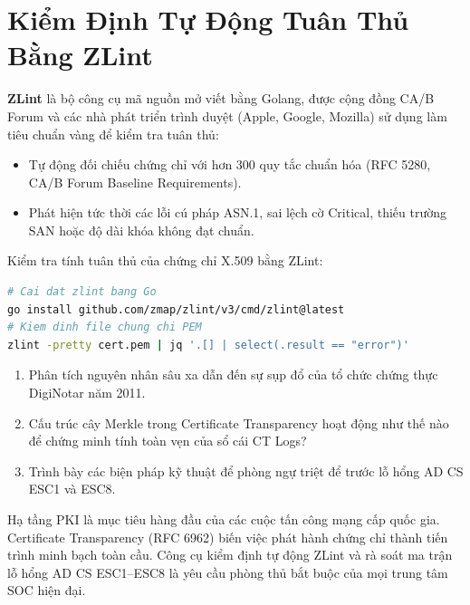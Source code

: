 \section{Kiểm Định Tự Động Tuân Thủ Bằng ZLint}

\textbf{ZLint} là bộ công cụ mã nguồn mở viết bằng Golang, được cộng đồng CA/B Forum và các nhà phát triển trình duyệt (Apple, Google, Mozilla) sử dụng làm tiêu chuẩn vàng để kiểm tra tuân thủ:
\begin{itemize}
  \item Tự động đối chiếu chứng chỉ với hơn 300 quy tắc chuẩn hóa (RFC 5280, CA/B Forum Baseline Requirements).
  \item Phát hiện tức thời các lỗi cú pháp ASN.1, sai lệch cờ Critical, thiếu trường SAN hoặc độ dài khóa không đạt chuẩn.
\end{itemize}

\begin{chayngay}
Kiểm tra tính tuân thủ của chứng chỉ X.509 bằng ZLint:
\begin{lstlisting}[language=bash]
# Cai dat zlint bang Go
go install github.com/zmap/zlint/v3/cmd/zlint@latest
# Kiem dinh file chung chi PEM
zlint -pretty cert.pem | jq '.[] | select(.result == "error")'
\end{lstlisting}
\end{chayngay}

\begin{tukiemtra}
\begin{enumerate}
  \item Phân tích nguyên nhân sâu xa dẫn đến sự sụp đổ của tổ chức chứng thực DigiNotar năm 2011.
  \item Cấu trúc cây Merkle trong Certificate Transparency hoạt động như thế nào để chứng minh tính toàn vẹn của sổ cái CT Logs?
  \item Trình bày các biện pháp kỹ thuật để phòng ngự triệt để trước lỗ hổng AD CS ESC1 và ESC8.
\end{enumerate}
\end{tukiemtra}

\begin{kbox}
Hạ tầng PKI là mục tiêu hàng đầu của các cuộc tấn công mạng cấp quốc gia. Certificate Transparency (RFC 6962) biến việc phát hành chứng chỉ thành tiến trình minh bạch toàn cầu. Công cụ kiểm định tự động ZLint và rà soát ma trận lỗ hổng AD CS ESC1--ESC8 là yêu cầu phòng thủ bắt buộc của mọi trung tâm SOC hiện đại.
\end{kbox}
